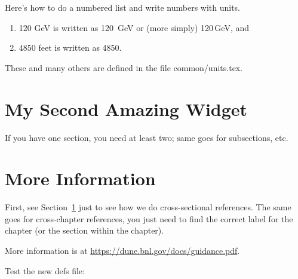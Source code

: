 Here's how to do a numbered list and write numbers with units. 
\begin{enumerate}
    \item 120 GeV is written as \SI{120}{\GeV} or (more simply)  120\,GeV, and
    \item 4850 feet is written as \SI{4850}{\ft}.
\end{enumerate}

These and many others are defined in the file common/units.tex.

\section{My Second Amazing Widget}
\label{sec:chap-id:my2ndwidget}

If you have one section, you need at least two; same goes for subsections, etc. 

\section{More Information}
\label{sec:chap-id:moreinfo}

First, see Section~\ref{sec:chap-id:my2ndwidget} just to see how we do cross-sectional references.  The same goes for cross-chapter references, you just need to find the correct label for the chapter (or the section within the chapter).

More information is at \url{https://dune.bnl.gov/docs/guidance.pdf}.

Test the new defs file: \testanne
